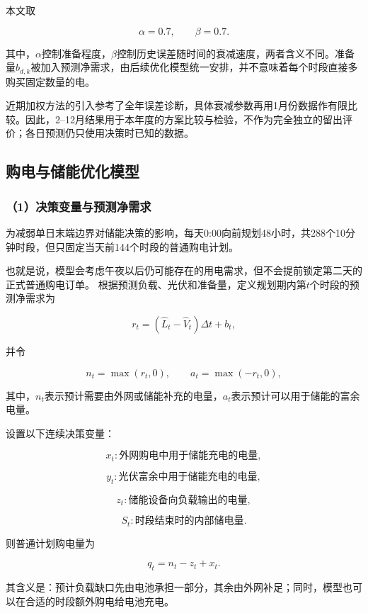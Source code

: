 本文取

\[
\alpha=0.7,\qquad \beta=0.7.
\]

其中，$\alpha$控制准备程度，$\beta$控制历史误差随时间的衰减速度，两者含义不同。准备量$b_{d,k}$被加入预测净需求，由后续优化模型统一安排，并不意味着每个时段直接多购买固定数量的电。

近期加权方法的引入参考了全年误差诊断，具体衰减参数再用1月份数据作有限比较。因此，2--12月结果用于本年度的方案比较与检验，不作为完全独立的留出评价；各日预测仍只使用决策时已知的数据。


\subsection{购电与储能优化模型}

\subsubsection*{（1）决策变量与预测净需求}

为减弱单日末端边界对储能决策的影响，每天0:00向前规划48小时，共288个10分钟时段，但只固定当天前144个时段的普通购电计划。

也就是说，模型会考虑午夜以后仍可能存在的用电需求，但不会提前锁定第二天的正式普通购电订单。
根据预测负载、光伏和准备量，定义规划期内第$t$个时段的预测净需求为

\begin{equation}
r_t
=
(\widehat L_t-\widehat V_t)\Delta t+b_t,
\label{eq:q2_net_demand}
\end{equation}

并令

\[
n_t=\max(r_t,0),
\qquad
a_t=\max(-r_t,0),
\]

其中，$n_t$表示预计需要由外网或储能补充的电量，$a_t$表示预计可以用于储能的富余电量。

设置以下连续决策变量：

\[
x_t:\text{外网购电中用于储能充电的电量},
\]

\[
y_t:\text{光伏富余中用于储能充电的电量},
\]

\[
z_t:\text{储能设备向负载输出的电量},
\]

\[
S_t:\text{时段结束时的内部储电量}.
\]

则普通计划购电量为

\begin{equation}
q_t=n_t-z_t+x_t.
\label{eq:q2_purchase}
\end{equation}

其含义是：预计负载缺口先由电池承担一部分，其余由外网补足；同时，模型也可以在合适的时段额外购电给电池充电。



